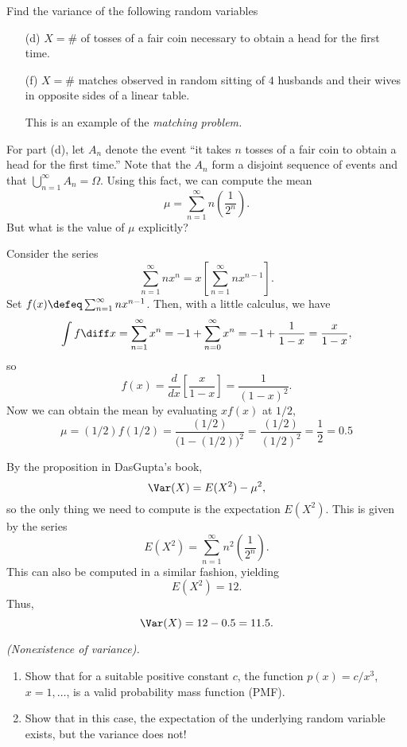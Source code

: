 \begin{problem}[Handout 7, \# 6(d, f)]
  Find the variance of the following random variables
  \begin{itemize}[noitemsep]
  \item[(d)] \(X=\#\) of tosses of a fair coin necessary to obtain a head
    for the first time.
  \item[(f)] \(X=\#\) matches observed in random sitting of \(4\) husbands
    and their wives in opposite sides of a linear table.

    This is an example of the \emph{matching problem.}
  \end{itemize}
\end{problem}
\begin{solution}
  For part (d), let \(A_n\) denote the event ``it takes \(n\) tosses of a
  fair coin to obtain a head for the first time.'' Note that the \(A_n\)
  form a disjoint sequence of events and that
  \(\bigcup_{n=1}^\infty A_n=\Omega\). Using this fact, we can compute the
  mean
  \[
    \mu=\sum_{n=1}^\infty n\left(\frac{1}{2^n}\right).
  \]
  But what is the value of \(\mu\) explicitly?

  Consider the series
  \[
    \sum_{n=1}^\infty n x^n=x\left[\sum_{n=1}^\infty nx^{n-1}\right].
  \]
  Set \(f(x)\defeq\sum_{n=1}^\infty nx^{n-1}\). Then, with a little
  calculus, we have
  \[
    \int f\diff x=\sum_{n=1}^\infty x^n
    =-1+\sum_{n=0}^\infty x^n=-1+\frac{1}{1-x}
    =\frac{x}{1-x},
  \]
  so
  \[
    f(x)=\frac{d}{dx}\left[\frac{x}{1-x}\right]=\frac{1}{(1-x)^2}.
  \]
  Now we can obtain the mean by evaluating \(xf(x)\) at \(1/2\),
  \[
    \mu=(1/2)f(1/2)=\frac{(1/2)}{\bigl(1-(1/2)\bigr)^2}=
    \frac{(1/2)}{(1/2)^2}=\frac{1}{2}=0.5
  \]

  By the proposition in DasGupta's book,
  \[
    \Var(X)=E(X^2)-\mu^2,
  \]
  so the only thing we need to compute is the expectation \(E(X^2)\). This
  is given by the series
  \[
    E(X^2)=\sum_{n=1}^\infty n^2\left(\frac{1}{2^n}\right).
  \]
  This can also be computed in a similar fashion, yielding
  \[
    E(X^2)=12.
  \]
  Thus,
  \[
    \Var(X)=12-0.5=11.5.
  \]
\end{solution}
\newpage

\begin{problem}[Handout 7, \# 8]
  \emph{(Nonexistence of variance).}
  \begin{enumerate}[label=(\alph*),noitemsep]
  \item Show that for a suitable positive constant \(c\), the function
    \(p(x)=c/x^3\), \(x=1,\dots\), is a valid probability mass function
    (PMF).
  \item Show that in this case, the expectation of the underlying random
    variable exists, but the variance does not!
  \end{enumerate}

\end{problem}
\begin{solution}

\end{solution}
\newpage

